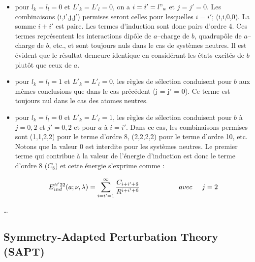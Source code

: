 	\begin{itemize}
		\item pour $l_{k}=l_{l}=0$ et  $L'_{k}=L'_{l}=0$, on a $i=i'=l"_{a}$ et $j=j'=0$. Les combinaisons (i,i',j,j') permises seront celles pour lesquelles $i = i'$; (i,i,0,0). La somme $i + i'$ est paire. Les termes d'induction sont donc pairs d'ordre 4. Ces termes représentent les interactions dipôle de $a$--charge de $b$, quadrupôle de $a$--charge de $b$, etc., et sont toujours nuls dans le cas de systèmes neutres. Il est évident que le résultat demeure identique en considérant les états excités de $b$ plutôt que ceux de $a$. 
		\item pour $l_{k} = l_{l} = 1 $ et  $L'_{k} = L'_{l} = 0$, les règles de sélection conduisent pour $b$ aux mêmes conclusions que dans le cas précédent (j = j' = 0). Ce terme est toujours nul dans le cas des atomes neutres.
		\item pour $l_{k} = l_{l} = 0 $ et  $L'_{k} = L'_{l} = 1$, les règles de sélection conduisent pour $b$ à $j=0, 2$ et $j'=0, 2$ et pour $a$ à $i = i'$. Dans ce cas, les combinaisons permises sont (1,1,2,2) pour le terme d'ordre 8, (2,2,2,2) pour le terme d'ordre 10, etc. Notons que la valeur 0 est interdite pour les systèmes neutres. Le premier terme qui contribue à la valeur de l'énergie d'induction est donc le terme d'ordre 8 ($C_{8}$) et cette énergie s'exprime comme : 
		
		\begin{equation}
		E_{ind}^{ii'22} (a;\nu , \lambda) = \sum_{i=i'=1}^{\infty} \frac{C_{i+i'+6}}{R^{i+i'+6}} \hspace{2cm} avec \hspace{0.5cm} j = 2
		\end{equation}
		
	\end{itemize}
	
	\ldots
	
	
	\subsection{Symmetry-Adapted Perturbation Theory (SAPT)}
	
